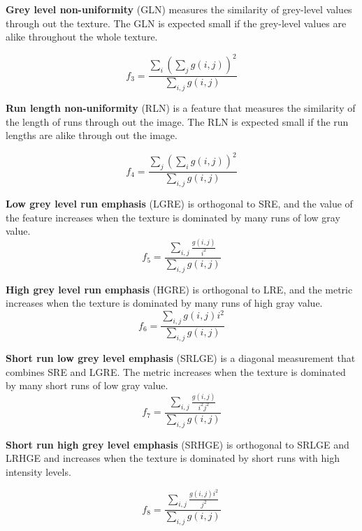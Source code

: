 \documentclass{InsightArticle}
\begin{document}
\textbf{Grey level non-uniformity} (GLN) measures the similarity of grey-level values through out the texture. The GLN is expected small if the grey-level values are alike throughout the whole texture.

\begin{equation} \label{eqn:ShapeInfluenceTerm}
f_3 = \frac{\sum_{i}\nolimits (\sum_{j}\nolimits g(i, j))^2}{\sum_{i,j}\nolimits g(i, j)} 
\end{equation}

\textbf{Run length non-uniformity} (RLN) is a feature that measures the similarity of the length of runs through out the image. The RLN is expected small if the run lengths are alike through out the image. 

\begin{equation} \label{eqn:ShapeInfluenceTerm}
f_4 = \frac{\sum_{j}\nolimits (\sum_{i}\nolimits g(i, j))^2}{\sum_{i,j}\nolimits g(i, j)} 
\end{equation}

\textbf{Low grey level run emphasis} (LGRE) is orthogonal to SRE, and the value of the feature increases when the texture is dominated by many runs of low gray value.
\begin{equation} \label{eqn:ShapeInfluenceTerm}
f_5 = \frac{\sum_{i,j}\nolimits \frac{g(i, j)}{i^2}}{\sum_{i,j}\nolimits g(i, j)}
\end{equation}

\textbf{High grey level run emphasis} (HGRE) is orthogonal to LRE, and the metric increases when the texture is dominated by many runs of high gray value. 
\begin{equation} \label{eqn:ShapeInfluenceTerm}
f_6 = \frac{\sum_{i,j}\nolimits g(i, j)i^2}{\sum_{i,j}\nolimits g(i, j)} 
\end{equation}

\textbf{Short run low grey level emphasis} (SRLGE) is a diagonal measurement that combines SRE and LGRE. The metric increases when the texture is dominated by many short runs of low gray value.
\begin{equation} \label{eqn:ShapeInfluenceTerm}
f_7 = \frac{\sum_{i,j}\nolimits \frac{g(i, j)}{i^2j^2}}{\sum_{i,j}\nolimits g(i, j)} 
\end{equation}

\textbf{Short run high grey level emphasis} (SRHGE) is orthogonal to SRLGE and LRHGE and increases when the texture is dominated by short runs with high intensity levels.

\begin{equation} \label{eqn:ShapeInfluenceTerm}
f_8 = \frac{\sum_{i,j}\nolimits \frac{g(i, j)i^2}{j^2}}{\sum_{i,j}\nolimits g(i, j)} 
\end{equation}
\end{document}

